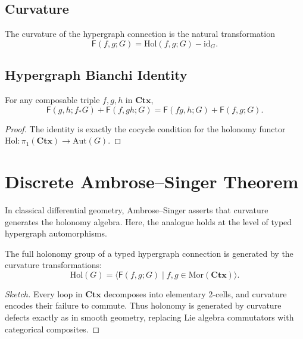 \subsection{Curvature}

\begin{definition}
The curvature of the hypergraph connection is the natural transformation
\[
\mathsf{F}(f,g;G)
= \mathrm{Hol}(f,g;G) - \mathrm{id}_G.
\]
\end{definition}

\subsection{Hypergraph Bianchi Identity}

\begin{theorem}
For any composable triple $f,g,h$ in $\mathbf{Ctx}$,
\[
\mathsf{F}(g,h;f_\ast G)
+\mathsf{F}(f,gh;G)
=
\mathsf{F}(fg,h;G)
+\mathsf{F}(f,g;G).
\]
\end{theorem}

\begin{proof}
The identity is exactly the cocycle condition for the holonomy functor
$\mathrm{Hol} : \pi_1(\mathbf{Ctx}) \to \mathrm{Aut}(G)$.
\end{proof}

\section{Discrete Ambrose--Singer Theorem}

In classical differential geometry, Ambrose--Singer asserts that curvature
generates the holonomy algebra.  
Here, the analogue holds at the level of typed hypergraph automorphisms.

\begin{theorem}
\label{thm:ambrose-singer}
The full holonomy group of a typed hypergraph connection is generated by
the curvature transformations:
\[
\mathrm{Hol}(G)
= \big\langle
\mathsf{F}(f,g;G)
\;\big|\;
f,g \in \mathrm{Mor}(\mathbf{Ctx})
\big\rangle.
\]
\end{theorem}

\begin{proof}[Sketch]
Every loop in $\mathbf{Ctx}$ decomposes into elementary 2-cells, and curvature
encodes their failure to commute.  
Thus holonomy is generated by curvature defects exactly as in smooth geometry,
replacing Lie algebra commutators with categorical composites.
\end{proof}

